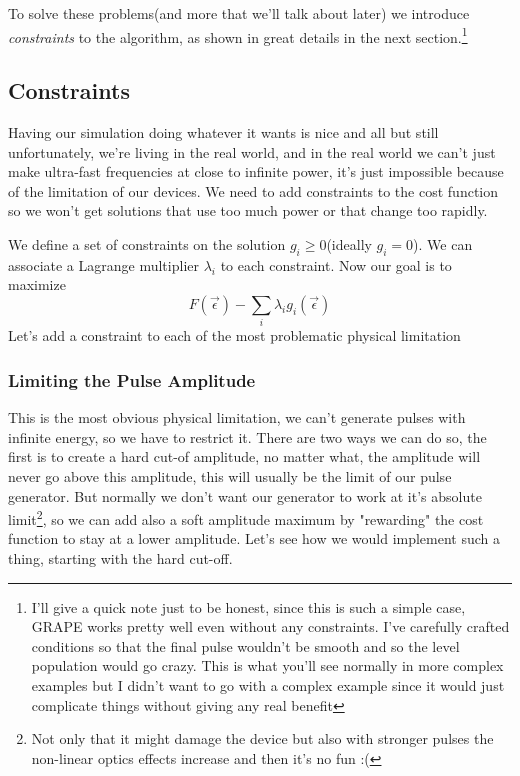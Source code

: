 \documentclass[english, a4paper, 12pt, twoside]{article}
\numberwithin{equation}{section} %
\begin{document}
To solve these problems(and more that we'll talk about later) we introduce \textit{constraints} to the algorithm, as shown in great details in the next section.\footnote{I'll give a quick note just to be honest, since this is such a simple case, GRAPE works pretty well even without any constraints. I've carefully crafted conditions so that the final pulse wouldn't be smooth and so the level population would go crazy. This is what you'll see normally in more complex examples but I didn't want to go with a complex example since it would just complicate things without giving any real benefit}

\subsection{Constraints}
Having our simulation doing whatever it wants is nice and all but still unfortunately, we're living in the real world, and in the real world we can't just make ultra-fast frequencies at close to infinite power, it's just impossible because of the limitation of our devices. We need to add constraints to the cost function so we won't get solutions that use too much power or that change too rapidly.

We define a set of constraints on the solution ${g_i \ge 0}$(ideally $g_i=0$). We can associate a Lagrange multiplier $\lambda_i$ to each constraint. \newline
Now our goal is to maximize 
$$F(\vec{\epsilon}) - \sum_i \lambda_i g_i(\vec{\epsilon})$$
Let's add a constraint to each of the most problematic physical limitation
\subsubsection{Limiting the Pulse Amplitude}
This is the most obvious physical limitation, we can't generate pulses with infinite energy, so we have to restrict it. There are two ways we can do so, the first is to create a hard cut-of amplitude, no matter what, the amplitude will never go above this amplitude, this will usually be the limit of our pulse generator. But normally we don't want our generator to work at it's absolute limit\footnote{Not only that it might damage the device but also with stronger pulses the non-linear optics effects increase and then it's no fun :(}, so we can add also a soft amplitude maximum by "rewarding" the cost function to stay at a lower amplitude. Let's see how we would implement such a thing, starting with the hard cut-off.
\end{document}

